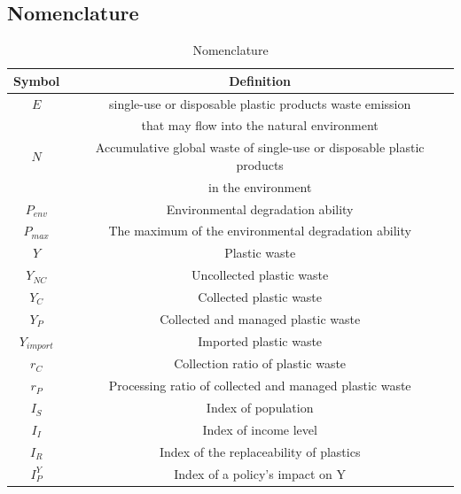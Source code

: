 \documentclass{mcmthesis}
\begin{document}
  \subsection{Nomenclature}
         \begin{table}[H]
			\renewcommand\arraystretch{1.2}
			\centering
            \caption{Nomenclature}
            \begin{tabular}{cc}%
            \toprule
             Symbol&Definition\\
             \midrule
			 $E$&single-use or disposable plastic products waste emission \\
			 &that may flow into the natural environment\\
         
			 $N$&Accumulative global waste of single-use or disposable plastic products\\
			 &in the environment\\
			 
             $P_{env}$&Environmental degradation ability \\
         
			 $P_{max}$&The maximum of the environmental degradation ability\\
			 
			 $Y$&Plastic waste\\
			 
			 $Y_{NC}$&Uncollected plastic waste\\

			 $Y_{C}$&Collected plastic waste \\

			 $Y_{P}$&Collected  and managed plastic waste\\

			 $Y_{import}$&Imported plastic waste\\

			 $r_C$&Collection ratio of plastic waste \\

			 $r_P$&Processing ratio of collected and managed plastic waste\\

			 $I_S$&Index of population\\

			 $I_I$&Index of income level\\

			 $I_R$&Index of the replaceability of plastics\\

			 $I_P^Y$&Index of a policy's impact on Y\\
			 

\end{tabular}
\end{table}
\end{document}
